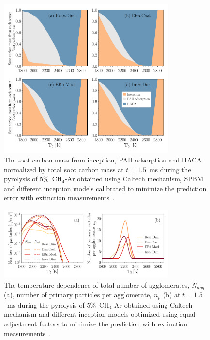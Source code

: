 \begin{figure}[H]
	\centering
	\includegraphics[width=0.8\textwidth]{Figures/Results/Shocktube/Agafonov2016_cpr/C_tot_distmap_5CH4.pdf}
	\caption{The soot carbon mass from inception, PAH adsorption and HACA normalized by total soot carbon mass at $t=1.5$~ms during the pyrolysis of 5\%~$\mathrm{CH_4}$-Ar obtained using Caltech mechanism, SPBM and different inception models calibrated to minimize the prediction error with extinction measurements~\citep{agafonov2016unified}.}
	\label{fig:shockagof_carbon_map_cpr} 
\end{figure}


\begin{figure}[H]
	\centering
	\includegraphics[width=0.8\textwidth]{Figures/Results/Shocktube/Agafonov2016_cpr/N_agg_n_p_5CH4.pdf}
	\caption{The temperature dependence of total number of agglomerates, $N_{agg}$ (a), number of primary particles per agglomerate, $n_p$ (b) at $t=1.5$~ms during the pyrolysis of 5\%~$\mathrm{CH_4}$-Ar obtained using Caltech mechanism and different inception models optimized using equal adjustment factors to minimize the prediction with extinction measurements~\citep{agafonov2016unified}.}
	\label{fig:shockagof_Nagg_np_cpr} 
\end{figure}



